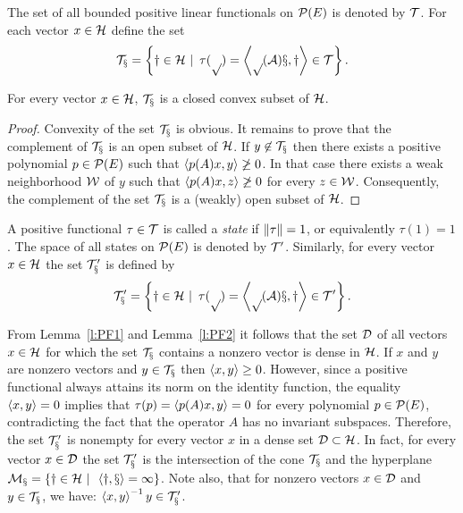 \begin{defn}
The set of all bounded positive linear functionals on ${\cal{P}}(E)$ is denoted by
$\cal T$. For each vector $x\in{\cal H}$ define the set
\[ \cal{T}_x = \left\{y\in{\cal H}\,\,|\,\,\,
               \tau(p) = \left<p(A)x,y\right> \in \cal{T}\right\}. \]
\end{defn}

\begin{lem} \label{l:PF3}
For every vector $x\in{\cal H}$, $\cal{T}_x$ is a closed convex subset of ${\cal H}$.
\end{lem}

\begin{proof}
Convexity of the set $\cal T_x$ is obvious. It remains to prove that the
complement of $\cal T_x$ is an open subset of ${\cal H}$. If $y\not\in\cal{T}_x$
then there exists a positive polynomial $p\in{\cal{P}}(E)$ such that $\left<p(A)x, y\right>
\not\geq 0$. In that case there exists a weak neighborhood $\cal W$ of $y$
such that $\left<p(A)x,z\right>\not\geq0$ for every $z\in\cal W$. Consequently, the
complement of the set $\cal T_x$ is a (weakly) open subset of ${\cal H}$.
\end{proof}

\begin{defn}
A positive functional $\tau\in\cal{T}$ is called a \emph{state} if
$\left\Vert\tau\right\Vert=1$, or equivalently $\tau(1)=1$. The space of all states on
${\cal{P}}(E)$ is denoted by $\cal{T}'$. Similarly, for every vector $x\in{\cal H}$ the
set $\cal{T}'_x$ is defined by
\[ \cal{T}'_x = \left\{y\in{\cal H}\,\,|\,\,\, \tau(p) =
   \left<p(A)x,y\right> \in \cal{T}'\right\}. \]
\end{defn}

\begin{rem}
From Lemma~\ref{l:PF1} and Lemma~\ref{l:PF2} it follows that the set ${\cal{D}}$
of all vectors $x\in{\cal H}$ for which the set $\cal{T}_x$ contains a nonzero
vector is dense in ${\cal H}$. If $x$ and $y$ are nonzero vectors and
$y\in\cal{T}_x$ then $\left<x,y\right>\geq0$. However, since a positive functional
always attains its norm on the identity function, the equality $\left<x,y\right>=0$
implies that $\tau(p)=\left<p(A)x,y\right>=0$ for every polynomial $p\in{\cal{P}}(E)$,
contradicting the fact that the operator $A$ has no invariant subspaces.
Therefore, the set $\cal{T}'_x$ is nonempty for every vector $x$ in a dense
set ${\cal{D}}\subset{\cal H}$. In fact, for every vector $x\in{\cal{D}}$ the set
$\cal{T}'_x$ is the intersection of the cone $\cal{T}_x$ and the hyperplane
$\cal{M}_x=\left\{y\in{\cal H}\,\,|\,\,\,\left<y,x\right>=1\right\}$. Note also, that for nonzero
vectors $x\in{\cal{D}}$ and $y\in\cal{T}_x$, we have:
$\left<x,y\right>^{-1}y\in\cal{T}'_x$.
\end{rem}

